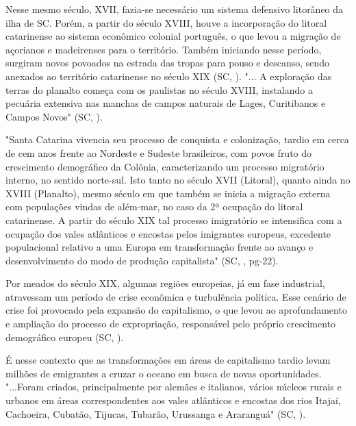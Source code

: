 \indent Nesse mesmo século, XVII, fazia-se necessário um sistema defensivo litorâneo da ilha de \acrlong{SC}. Porém, a partir do século XVIII, houve a incorporação do litoral catarinense ao sistema econômico colonial português, o que levou a migração de açorianos e madeirenses para o território. Também iniciando nesse período, surgiram novos povoados na estrada das tropas para pouso e descanso, sendo anexados ao território catarinense no século XIX (\acrlong{SC}, \citeyear{AtlasSCterritorio}). "... A exploração das terras do planalto começa com os paulistas no século XVIII, instalando a pecuária extensiva nas manchas de campos naturais de Lages, Curitibanos e Campos Novos" (\acrlong{SC}, \citeyear{AtlasSCpopulacao}).

\begin{citacao}
"Santa Catarina vivencia seu processo de conquista e colonização, tardio em cerca de cem anos frente ao Nordeste e Sudeste brasileiros, com povos fruto do crescimento demográfico da Colônia, caracterizando um processo migratório interno, no sentido norte-sul. Isto tanto no século XVII (Litoral), quanto ainda no XVIII (Planalto), mesmo século em que também se inicia a migração externa com populações vindas de além-mar, no caso da 2ª ocupação do litoral catarinense. A partir do século XIX tal processo imigratório se intensifica com a ocupação dos vales atlânticos e encostas pelos imigrantes europeus, excedente populacional  relativo a uma Europa em transformação frente ao avanço e desenvolvimento do modo de produção capitalista" (\acrlong{SC}, \citeyear{AtlasSCpopulacao}, pg-22). 
\end{citacao}

\indent Por meados do século XIX, algumas regiões europeias, já em fase industrial, atravessam um período de crise econômica e turbulência política. Esse cenário de crise foi provocado pela expansão do capitalismo, o que levou ao aprofundamento e ampliação do processo de expropriação, responsável pelo próprio crescimento demográfico europeu (\acrlong{SC}, \citeyear{AtlasSCpopulacao}).

\indent É nesse contexto que as transformações em áreas de capitalismo tardio levam milhões de emigrantes a cruzar o oceano em busca de novas oportunidades. "...Foram criados, principalmente por alemães e italianos, vários núcleos rurais e urbanos em áreas correspondentes aos vales atlânticos e encostas dos rios Itajaí, Cachoeira, Cubatão, Tijucas, Tubarão, Urussanga e Araranguá" (\acrlong{SC}, \citeyear{AtlasSCpopulacao}).

